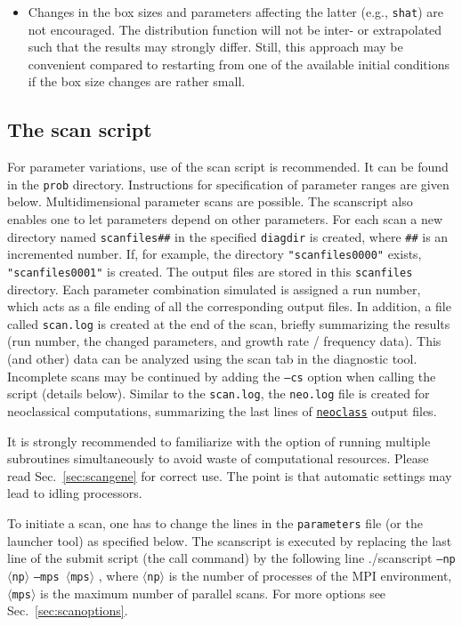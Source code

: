\documentclass[12pt]{article}
\begin{document}
\begin{itemize}
 \item Changes in the box sizes and parameters affecting the latter (e.g., {\tt shat}) are not
 encouraged. The distribution function will not be inter- or extrapolated such that the results
 may strongly differ. Still, this approach may be convenient compared to restarting from one of the
 available initial conditions if the box size changes are rather small.


\end{itemize}


\subsection{The scan script}\label{sec:scanscript}
For \gene parameter variations, use of the scan script is recommended. It can be found
in the \texttt{prob} directory.
Instructions for specification of parameter ranges are given below.
Multidimensional parameter scans are possible.
The scanscript also enables one to let parameters depend on other parameters.
For each scan a new directory named \texttt{scanfiles\#\#} in the specified
\texttt{diagdir} is created, where \texttt{\#\#} is an incremented number. If, for
example, the directory \texttt{"scanfiles0000"} exists,
\texttt{"scanfiles0001"} is created.
The output files are stored in this \texttt{scanfiles} directory. Each
parameter combination simulated is assigned a run number, which acts as a
file ending of all the corresponding output files.
In addition, a file called \texttt{scan.log} is created at the end of
the scan, briefly summarizing the results (run number, the changed parameters, and growth rate /
frequency data).
This (and other) data can be analyzed using the scan tab in the diagnostic tool.
Incomplete scans may be continued by adding the \texttt{--cs} option when calling the
script (details below).
Similar to the \texttt{scan.log}, the \texttt{neo.log} file is created for neoclassical
computations, summarizing the last lines of
\hyperref[subsec:neoclass-file]{\texttt{neoclass}} output files.

It is strongly recommended to familiarize with the \gene option of running multiple \gene
subroutines simultaneously to avoid waste of computational resources. Please read Sec.~\ref{sec:scangene} for correct use. The point is that automatic settings may lead to idling processors.

To initiate a \gene scan, one has to change the lines in the \texttt{parameters} file (or
the launcher tool) as specified below. The scanscript is executed by
replacing the last line of the submit script (the \gene call command)
by the following line
./scanscript \texttt{--np $\langle$np$\rangle$} \texttt{--mps $\langle$mps$\rangle$} ,
where \texttt{$\langle$np$\rangle$} is the number of processes of the
MPI environment, \texttt{$\langle$mps$\rangle$} is the maximum number of
parallel scans. For more options see Sec.~\ref{sec:scanoptions}.
\end{document}
